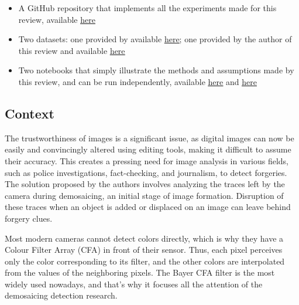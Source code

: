 \documentclass[sigconf, nonacm]{acmart}
\begin{document}
\begin{itemize}
    \item A GitHub repository that implements all the experiments made for this review, available \href{https://github.com/DentanJeremie/demosaicing-detection}{\underline{here}}
    \item Two datasets: one provided by \cite{colom_noise_2023}  available \href{http://mcolom.info/pages/no_noise_images/}{\underline{here}}; one provided by the author of this review \cite{dentan_dataset_2023} and available \href{https://gist.github.com/DentanJeremie/21bfd925c5234afd15d854135b569bec}{\underline{here}}
    \item Two notebooks that simply illustrate the methods and assumptions made by this review, and can be run independently, available \href{https://github.com/DentanJeremie/demosaicing-detection/blob/main/doc/forgery_detection_demonstration.ipynb}{\underline{here}} and \href{https://github.com/DentanJeremie/demosaicing-detection/blob/main/doc/configuration_detection_demonstration.ipynb}{\underline{here}}
\end{itemize}

\subsection{Context}

The trustworthiness of images is a significant issue, as digital images can now be easily and convincingly altered using editing tools, making it difficult to assume their accuracy. This creates a pressing need for image analysis in various fields, such as police investigations, fact-checking, and journalism, to detect forgeries. The solution proposed by the authors involves analyzing the traces left by the camera during demosaicing, an initial stage of image formation. Disruption of these traces when an object is added or displaced on an image can leave behind forgery clues.

Most modern cameras cannot detect colors directly, which is why they have a Colour Filter Array (CFA) in front of their sensor. Thus, each pixel perceives only the color corresponding to its filter, and the other colors are interpolated from the values of the neighboring pixels. The Bayer CFA filter is the most widely used nowadays, and that's why it focuses all the attention of the demosaicing detection research. 
\end{document}
